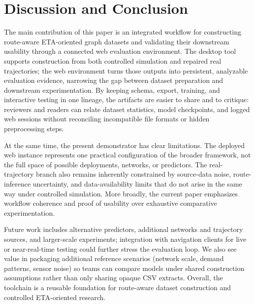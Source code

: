 \section{Discussion and Conclusion}\label{sec:discussion}

The main contribution of this paper is an integrated workflow for constructing route-aware ETA-oriented graph datasets and validating their downstream usability through a connected web evaluation environment. The desktop tool supports construction from both controlled simulation and repaired real trajectories; the web environment turns those outputs into persistent, analyzable evaluation evidence, narrowing the gap between dataset preparation and downstream experimentation.
By keeping schema, export, training, and interactive testing in one lineage, the artifacts are easier to share and to critique: reviewers and readers can relate dataset statistics, model checkpoints, and logged web sessions without reconciling incompatible file formats or hidden preprocessing steps.

At the same time, the present demonstrator has clear limitations. The deployed web instance represents one practical configuration of the broader framework, not the full space of possible deployments, networks, or predictors. The real-trajectory branch also remains inherently constrained by source-data noise, route-inference uncertainty, and data-availability limits that do not arise in the same way under controlled simulation. More broadly, the current paper emphasizes workflow coherence and proof of usability over exhaustive comparative experimentation.

Future work includes alternative predictors, additional networks and trajectory sources, and larger-scale experiments; integration with navigation clients for live or near-real-time testing could further stress the evaluation loop.
We also see value in packaging additional reference scenarios (network scale, demand patterns, sensor noise) so teams can compare models under shared construction assumptions rather than only sharing opaque CSV extracts.
Overall, the toolchain is a reusable foundation for route-aware dataset construction and controlled ETA-oriented research.
